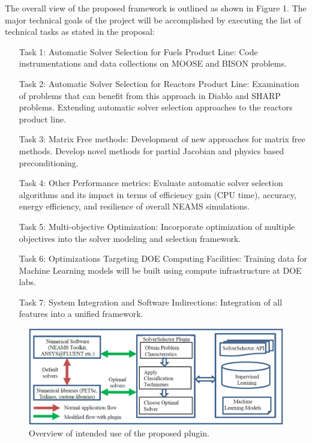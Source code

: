 The overall view of the proposed framework is outlined as shown in Figure 1. The major technical goals of the project will be accomplished by executing the  list of technical tasks as stated in the proposal:
\begin{itemize}
\item[Task 1:] Automatic Solver Selection for Fuels Product Line: Code instrumentations and data collections on MOOSE and BISON problems.
\item[Task 2:] Automatic Solver Selection for Reactors Product Line: Examination of problems that can benefit from this approach in Diablo and SHARP problems. 
Extending automatic solver selection approaches to the reactors product line. 
\item[Task 3:] Matrix Free methods: Development of new approaches for matrix free methods. Develop novel methods for partial Jacobian and physics based preconditioning.
\item[Task 4:] Other Performance metrics: Evaluate automatic solver selection 
algorithms and its impact in terms of efficiency gain (CPU time), accuracy, 
energy efficiency, and resilience of overall NEAMS simulations.
\item[Task 5:] Multi-objective Optimization: Incorporate optimization of multiple 
objectives into the solver modeling and selection framework.
\item[Task 6:] Optimizations Targeting DOE Computing Facilities: Training data for 
Machine Learning models will be built using compute infrastructure at DOE labs.
\item[Task 7:] System Integration and Software Indirections: Integration of all 
features into a unified framework.
\end{itemize}

\begin{figure}
 \includegraphics[width=\textwidth]{figures/proposed_framework.png}
  \caption{ Overview of intended use of the proposed plugin.\label{fig:overview} }
 \end{figure}


